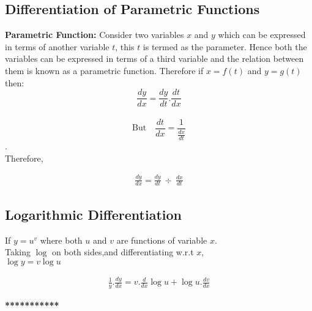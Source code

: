 \subsection{ Differentiation of Parametric Functions}

\textbf{Parametric Function:} Consider two variables $x$ and $y$ which can be expressed in terms of another variable $t$, this $t$ is termed as the parameter. Hence both the variables can be expressed in terms of a third variable and the relation between them is known as a parametric function. Therefore if $x = f(t)$ and $y = g(t)$ then: \\[5pt]
$$\frac{dy}{dx} = \frac{dy}{dt}.\frac{dt}{dx}$$ \\
$$ \text{But} \quad \dfrac{dt}{dx} = \dfrac{1}{\frac{dx}{dt}}$$. \\ 

Therefore, 
\begin{tcolorbox}
\begin{center}
\begin{align*}
\frac{dy}{dx} = \frac{dy}{dt} \: \div \: \frac{dx}{dt} 
\end{align*}
\end{center}
\end{tcolorbox}

\subsection{ Logarithmic Differentiation}
If $y = u^v$ where both $u$ and $v$ are functions of variable $x$.\\[2mm]

\noindent
Taking $\log$ on both sides,and differentiating w.r.t $x$, \\[2mm]
$\log y = v \log u$ \\[2mm]
\vspace{-2mm}
\begin{tcolorbox}
\begin{center}
\begin{align*}
\frac{1}{y}.\frac{dy}{dx} = v.\frac{d}{dx} \log u + \log u . \frac{dv}{dx}
\end{align*}
\end{center}
\end{tcolorbox}

\vspace{5mm}
\begin{center}
\textbf{***********}
\end{center}